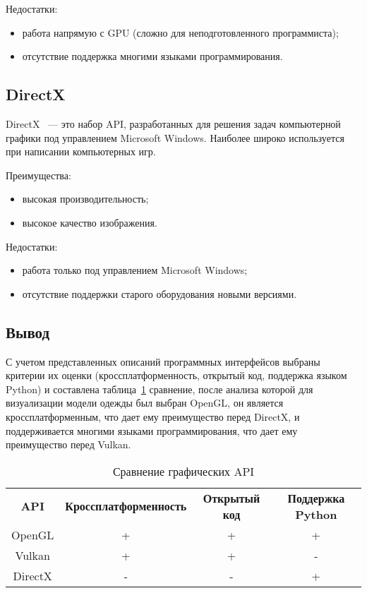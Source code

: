 Недостатки:
\begin{itemize}
    \item работа напрямую с GPU (сложно для неподготовленного программиста);
    \item отсутствие поддержка многими языками программирования.
\end{itemize}

\subsection{DirectX}

DirectX~\cite{bib17} --- это набор API, разработанных для решения задач
компьютерной графики под управлением Microsoft Windows. Наиболее широко
используется при написании компьютерных игр.

Преимущества:
\begin{itemize}
    \item высокая производительность;
    \item высокое качество изображения.
\end{itemize}

Недостатки:
\begin{itemize}
    \item работа только под управлением Microsoft Windows;
    \item отсутствие поддержки старого оборудования новыми версиями. 
\end{itemize}

\subsection*{Вывод}

С учетом представленных описаний программных интерфейсов выбраны критерии их
оценки (кроссплатформенность, открытый код, поддержка языком Python) и
составлена таблица~\ref{tab:api} сравнение, после анализа которой для
визуализации модели одежды был выбран OpenGL, он является кроссплатформенным,
что дает ему преимущество перед DirectX, и поддерживается многими языками
программирования, что дает ему преимущество перед Vulkan.

\noindent
\begin{longtable}[Hc]{|c|c|c|c|}
\captionsetup{format=hang,justification=raggedright,
              singlelinecheck=off,width=16.3cm}
\caption{Сравнение графических API\label{tab:api}}\\
    \hline
    \multicolumn{1}{|c|}{\textbf{API}} &
    \multicolumn{1}{c|}{\textbf{Кроссплатформенность}} &
    \multicolumn{1}{c|}{\textbf{Открытый код}} &
    \multicolumn{1}{c|}{\textbf{Поддержка Python}}\\
    \hline
    OpenGL    & + & + & + \\
    \hline
    Vulkan    & + & + & - \\
    \hline
    DirectX   & - & - & + \\
    \hline
\end{longtable}

